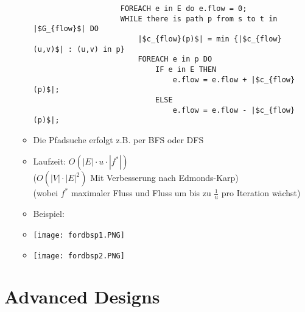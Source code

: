 \begin{itemize}
\begin{itemize}
\begin{verbatim}
                    FOREACH e in E do e.flow = 0;
                    WHILE there is path p from s to t in |$G_{flow}$| DO
                        |$c_{flow}(p)$| = min {|$c_{flow}(u,v)$| : (u,v) in p}
                        FOREACH e in p DO
                            IF e in E THEN
                                e.flow = e.flow + |$c_{flow}(p)$|;
                            ELSE
                                e.flow = e.flow - |$c_{flow}(p)$|;
                    \end{verbatim}
                \item Die Pfadsuche erfolgt z.B. per BFS oder DFS
                \item Laufzeit: $O(|E| \cdot u \cdot |f^*|)$ \\
                        ($O(|V| \cdot |E|^2)$ Mit Verbesserung nach Edmonds-Karp) \\
                        (wobei $f^*$ maximaler Fluss und Fluss um bis zu $\frac{1}{u}$ pro Iteration wächst)
                \item Beispiel:
                \item[] \texttt{[image: fordbsp1.PNG]}
                \item[] \texttt{[image: fordbsp2.PNG]}
            \end{itemize}
    \end{itemize}

\section{Advanced Designs}
